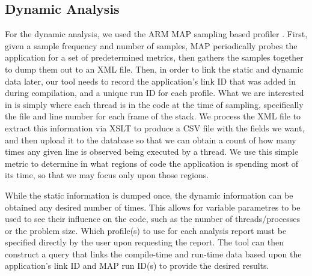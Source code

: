 \subsection{Dynamic Analysis}
\label{sec:dynamic}
For the dynamic analysis, we used the ARM MAP sampling based profiler \cite{arm-docs}.
First, given a sample frequency and number of samples, MAP periodically probes the application for a set of predetermined metrics, then gathers the samples together to dump them out to an \acs{XML} file.
Then, in order to link the static and dynamic data later, our tool needs to record the application's link ID that was added in during compilation, and a unique run ID for each profile.
What we are interested in is simply where each thread is in the code at the time of sampling, specifically the file and line number for each frame of the stack.
We process the \acs{XML} file to extract this information via \ac{XSLT} to produce a \acs{CSV} file with the fields we want, and then upload it to the database so that we can obtain a count of how many times any given line is observed being executed by a thread.
We use this simple metric to determine in what regions of code the application is spending most of its time, so that we may focus only upon those regions.

While the static information is dumped once, the dynamic information can be obtained any desired number of times.
This allows for variable parametres to be used to see their influence on the code, such as the number of threads/processes or the problem size.
Which profile(s) to use for each analysis report must be specified directly by the user upon requesting the report.
The tool can then construct a query that links the compile-time and run-time data based upon the application's link ID and MAP run ID(s) to provide the desired results.
